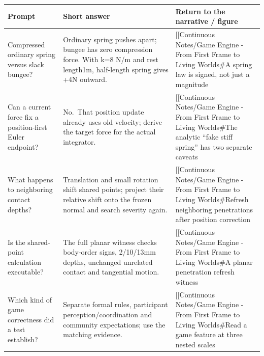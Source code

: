 \hypertarget{appendix-64ea716dcadc-signed-forces-and-changing-contacts}{}

{\def\LTcaptype{none} %
\begin{longtable}[]{@{}
  >{\raggedright\arraybackslash}p{}
  >{\raggedright\arraybackslash}p{}
  >{\raggedright\arraybackslash}p{}@{}}
\toprule\noalign{}
\begin{minipage}[b]{\linewidth}\raggedright
Prompt
\end{minipage} & \begin{minipage}[b]{\linewidth}\raggedright
Short answer
\end{minipage} & \begin{minipage}[b]{\linewidth}\raggedright
Return to the narrative / figure
\end{minipage} \\
\midrule\noalign{}
\endhead
\bottomrule\noalign{}
\endlastfoot
Compressed ordinary spring versus slack bungee? & Ordinary spring pushes apart; bungee has zero compression force. With k=8 N/m and rest length1m, half-length spring gives +4N outward. & {[}{[}Continuous Notes/Game Engine - From First Frame to Living Worlds\#A spring law is signed, not just a magnitude \\
Can a current force fix a position-first Euler endpoint? & No.~That position update already uses old velocity; derive the target force for the actual integrator. & {[}{[}Continuous Notes/Game Engine - From First Frame to Living Worlds\#The analytic ``fake stiff spring'' has two separate caveats \\
What happens to neighboring contact depths? & Translation and small rotation shift shared points; project their relative shift onto the frozen normal and search severity again. & {[}{[}Continuous Notes/Game Engine - From First Frame to Living Worlds\#Refresh neighboring penetrations after position correction \\
Is the shared-point calculation executable? & The full planar witness checks body-order signs, 2/10/13mm depths, unchanged unrelated contact and tangential motion. & {[}{[}Continuous Notes/Game Engine - From First Frame to Living Worlds\#A planar penetration refresh witness \\
Which kind of game correctness did a test establish? & Separate formal rules, participant perception/coordination and community expectations; use the matching evidence. & {[}{[}Continuous Notes/Game Engine - From First Frame to Living Worlds\#Read a game feature at three nested scales \\
\end{longtable}
}

